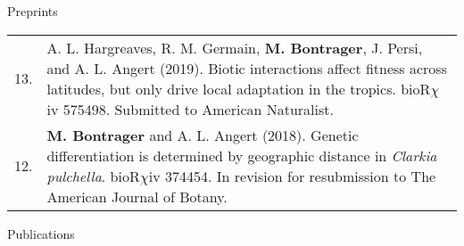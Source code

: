 \documentclass[letterpaper,11pt,oneside]{article}
\newcommand\hangbibentry[1]{%
    \smallskip\par\hangpara{1em}{1}\bibentry{#1}\smallskip\par 
}
\begin{document}

\bgroup
\noindent\Large{Preprints} 
\normalsize
\bigskip

\def\arraystretch{1.2}
\noindent \begin{tabular}{@{} p{1cm} >{\raggedright\arraybackslash}p{15.11cm}}
13. & A. L. Hargreaves, R. M. Germain, \textbf{M. Bontrager}, J. Persi, and A. L. Angert (2019). Biotic interactions affect fitness across latitudes, but only drive local adaptation in the tropics.  bioR$\chi$iv 575498. Submitted to American Naturalist. \\
12. & \textbf{M. Bontrager} and A. L. Angert (2018). Genetic differentiation is determined by geographic distance in \textit{Clarkia pulchella}. bioR$\chi$iv 374454. In revision for resubmission to The American Journal of Botany. \\
\end{tabular}
\egroup

\bigskip
\bigskip

\bigskip
\bigskip


\bgroup
\noindent\Large{Publications}  
\normalsize
\bigskip
\end{document}
